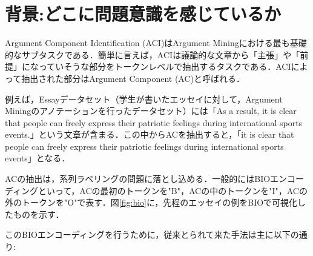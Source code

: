 \documentclass[a4j,fleqn,10pt]{jarticle}
\begin{document}
\setlength{\abovedisplayskip}{-4pt} %
\setlength{\belowdisplayskip}{2pt} %





\maketitle



\section{背景:どこに問題意識を感じているか}
Argument Component Identification (ACI)はArgument Miningにおける最も基礎的なサブタスクである．簡単に言えば，ACIは議論的な文章から「主張」や「前提」になっていそうな部分をトークンレベルで抽出するタスクである\cite{stab2017}．ACIによって抽出された部分はArgument Component (AC)と呼ばれる．

\par
例えば，Essayデータセット\cite{stab2017}（学生が書いたエッセイに対して，Argument Miningのアノテーションを行ったデータセット）には「As a result, it is clear that people can freely express their patriotic feelings during international sports events.」という文章が含まる．この中からACを抽出すると，「it is clear that people can freely express their patriotic feelings during international sports events」となる．

\par
ACの抽出は，系列ラベリングの問題に落とし込める．一般的にはBIOエンコーディングといって，ACの最初のトークンを"B"，ACの中のトークンを"I"，ACの外のトークンを"O"で表す．図\ref{fig:bio}に，先程のエッセイの例をBIOで可視化したものを示す．

\par
このBIOエンコーディングを行うために，従来とられて来た手法は主に以下の通り:
\end{document}
